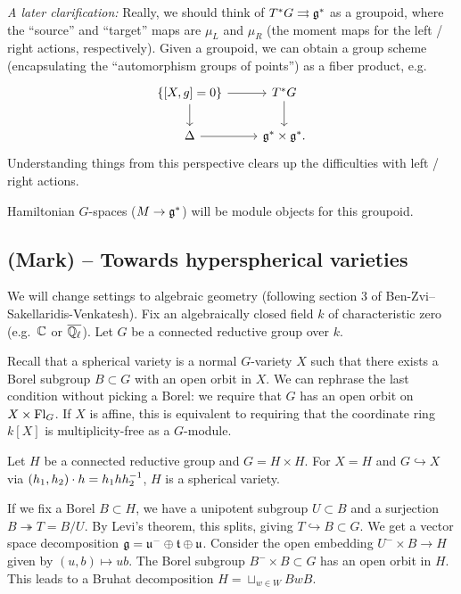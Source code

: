 \documentclass{article}
\begin{document}
\emph{A later clarification:} 
Really, we should think of $T^*G \rightrightarrows \mathfrak{g}^*$ as a groupoid, where the ``source'' and ``target'' maps are $\mu_L$ and $\mu_R$ (the moment maps for the left / right actions, respectively).
Given a groupoid, we can obtain a group scheme (encapsulating the ``automorphism groups of points'') as a fiber product, e.g.\
\[
	\begin{tikzcd}
		\{ [X, g] = 0 \} \rar \dar & T^* G \dar \\
		\Delta \rar & \gf^* \times \gf^*.
	\end{tikzcd}
\]
Understanding things from this perspective clears up the difficulties with left / right actions.

Hamiltonian $G$-spaces ($M \to \mathfrak{g}^*$) will be module objects for this groupoid.

\subsection{(Mark) -- Towards hyperspherical varieties}

We will change settings to algebraic geometry (following section 3 of Ben-Zvi--Sakellaridis-Venkatesh).
Fix an algebraically closed field $k$ of characteristic zero (e.g.\ $\mathbb{C}$ or $\overline{\mathbb{Q}_\ell}$).
Let $G$ be a connected reductive group over $k$.

Recall that a spherical variety is a normal $G$-variety $X$ such that there exists a Borel subgroup $B \subset G$ with an open orbit in $X$.
We can rephrase the last condition without picking a Borel: we require that $G$ has an open orbit on $X \times \operatorname{Fl}_G$.
If $X$ is affine, this is equivalent to requiring that the coordinate ring $k[X]$ is multiplicity-free as a $G$-module.

\begin{ex}
	Let $H$ be a connected reductive group and $G = H \times H$.
	For $X = H$ and $G \hookrightarrow X$ via $(h_1, h_2) \cdot h = h_1 h h_2^{-1}$, $H$ is a spherical variety.

	If we fix a Borel $B \subset H$, we have a unipotent subgroup $U \subset B$ and a surjection $B \twoheadrightarrow T = B/U$.
	By Levi's theorem, this splits, giving $T \hookrightarrow B \subset G$.
	We get a vector space decomposition $\mathfrak{g} = \mathfrak{u}^- \oplus \mathfrak{t} \oplus \mathfrak{u}$.
	Consider the open embedding $U^- \times B \to H$ given by $(u, b) \mapsto ub$.
	The Borel subgroup $B^- \times B \subset G$ has an open orbit in $H$.
	This leads to a Bruhat decomposition $H = \sqcup_{w \in W} B w B$.
\end{ex}
\end{document}
